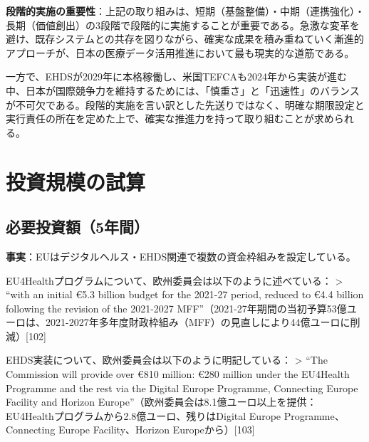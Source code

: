 \documentclass[
  a4paper,
  a4paper,
  11pt]{ltjsbook}
\begin{document}
\begin{tcolorbox}[enhanced jigsaw, toprule=.15mm, bottomtitle=1mm, coltitle=black, left=2mm, opacityback=0, arc=.35mm, colbacktitle=quarto-callout-note-color!10!white, colback=white, opacitybacktitle=0.6, bottomrule=.15mm, rightrule=.15mm, breakable, title=\textcolor{quarto-callout-note-color}{\faInfo}\hspace{0.5em}{Note}, toptitle=1mm, titlerule=0mm, colframe=quarto-callout-note-color-frame, leftrule=.75mm]

\textbf{段階的実施の重要性}：上記の取り組みは、短期（基盤整備）・中期（連携強化）・長期（価値創出）の3段階で段階的に実施することが重要である。急激な変革を避け、既存システムとの共存を図りながら、確実な成果を積み重ねていく漸進的アプローチが、日本の医療データ活用推進において最も現実的な道筋である。

一方で、EHDSが2029年に本格稼働し、米国TEFCAも2024年から実装が進む中、日本が国際競争力を維持するためには、「慎重さ」と「迅速性」のバランスが不可欠である。段階的実施を言い訳とした先送りではなく、明確な期限設定と実行責任の所在を定めた上で、確実な推進力を持って取り組むことが求められる。

\end{tcolorbox}

\section{投資規模の試算}\label{ux6295ux8cc7ux898fux6a21ux306eux8a66ux7b97}

\subsection{必要投資額（5年間）}\label{ux5fc5ux8981ux6295ux8cc7ux984d5ux5e74ux9593}

\textbf{事実}：EUはデジタルヘルス・EHDS関連で複数の資金枠組みを設定している。

EU4Healthプログラムについて、欧州委員会は以下のように述べている：
\textgreater{} ``with an initial €5.3 billion budget for the 2021-27
period, reduced to €4.4 billion following the revision of the 2021-2027
MFF''（2021-27年期間の当初予算53億ユーロは、2021-2027年多年度財政枠組み（MFF）の見直しにより44億ユーロに削減）{[}102{]}

EHDS実装について、欧州委員会は以下のように明記している： \textgreater{}
``The Commission will provide over €810 million: €280 million under the
EU4Health Programme and the rest via the Digital Europe Programme,
Connecting Europe Facility and Horizon
Europe''（欧州委員会は8.1億ユーロ以上を提供：EU4Healthプログラムから2.8億ユーロ、残りはDigital
Europe Programme、Connecting Europe Facility、Horizon
Europeから）{[}103{]}
\end{document}
